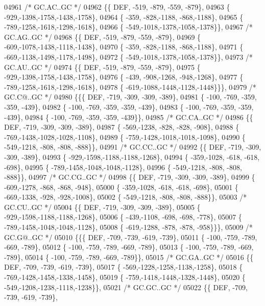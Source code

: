 \begin{DoxyCode}
04961 \textcolor{comment}{/* GC.AC..GC */}
04962 \{\{  DEF, -519, -879, -559, -879\},
04963 \{ -929,-1398,-1758,-1438,-1758\},
04964 \{ -359, -828,-1188, -868,-1188\},
04965 \{ -789,-1258,-1618,-1298,-1618\},
04966 \{ -549,-1018,-1378,-1058,-1378\}\},
04967 \textcolor{comment}{/* GC.AG..GC */}
04968 \{\{  DEF, -519, -879, -559, -879\},
04969 \{ -609,-1078,-1438,-1118,-1438\},
04970 \{ -359, -828,-1188, -868,-1188\},
04971 \{ -669,-1138,-1498,-1178,-1498\},
04972 \{ -549,-1018,-1378,-1058,-1378\}\},
04973 \textcolor{comment}{/* GC.AU..GC */}
04974 \{\{  DEF, -519, -879, -559, -879\},
04975 \{ -929,-1398,-1758,-1438,-1758\},
04976 \{ -439, -908,-1268, -948,-1268\},
04977 \{ -789,-1258,-1618,-1298,-1618\},
04978 \{ -619,-1088,-1448,-1128,-1448\}\}\},
04979 \textcolor{comment}{/* GC.C@..GC */}
04980 \{\{\{  DEF, -719, -309, -309, -389\},
04981 \{ -100, -769, -359, -359, -439\},
04982 \{ -100, -769, -359, -359, -439\},
04983 \{ -100, -769, -359, -359, -439\},
04984 \{ -100, -769, -359, -359, -439\}\},
04985 \textcolor{comment}{/* GC.CA..GC */}
04986 \{\{  DEF, -719, -309, -309, -389\},
04987 \{ -569,-1238, -828, -828, -908\},
04988 \{ -769,-1438,-1028,-1028,-1108\},
04989 \{ -759,-1428,-1018,-1018,-1098\},
04990 \{ -549,-1218, -808, -808, -888\}\},
04991 \textcolor{comment}{/* GC.CC..GC */}
04992 \{\{  DEF, -719, -309, -309, -389\},
04993 \{ -929,-1598,-1188,-1188,-1268\},
04994 \{ -359,-1028, -618, -618, -698\},
04995 \{ -789,-1458,-1048,-1048,-1128\},
04996 \{ -549,-1218, -808, -808, -888\}\},
04997 \textcolor{comment}{/* GC.CG..GC */}
04998 \{\{  DEF, -719, -309, -309, -389\},
04999 \{ -609,-1278, -868, -868, -948\},
05000 \{ -359,-1028, -618, -618, -698\},
05001 \{ -669,-1338, -928, -928,-1008\},
05002 \{ -549,-1218, -808, -808, -888\}\},
05003 \textcolor{comment}{/* GC.CU..GC */}
05004 \{\{  DEF, -719, -309, -309, -389\},
05005 \{ -929,-1598,-1188,-1188,-1268\},
05006 \{ -439,-1108, -698, -698, -778\},
05007 \{ -789,-1458,-1048,-1048,-1128\},
05008 \{ -619,-1288, -878, -878, -958\}\}\},
05009 \textcolor{comment}{/* GC.G@..GC */}
05010 \{\{\{  DEF, -709, -739, -619, -739\},
05011 \{ -100, -759, -789, -669, -789\},
05012 \{ -100, -759, -789, -669, -789\},
05013 \{ -100, -759, -789, -669, -789\},
05014 \{ -100, -759, -789, -669, -789\}\},
05015 \textcolor{comment}{/* GC.GA..GC */}
05016 \{\{  DEF, -709, -739, -619, -739\},
05017 \{ -569,-1228,-1258,-1138,-1258\},
05018 \{ -769,-1428,-1458,-1338,-1458\},
05019 \{ -759,-1418,-1448,-1328,-1448\},
05020 \{ -549,-1208,-1238,-1118,-1238\}\},
05021 \textcolor{comment}{/* GC.GC..GC */}
05022 \{\{  DEF, -709, -739, -619, -739\},

\end{DoxyCode}
